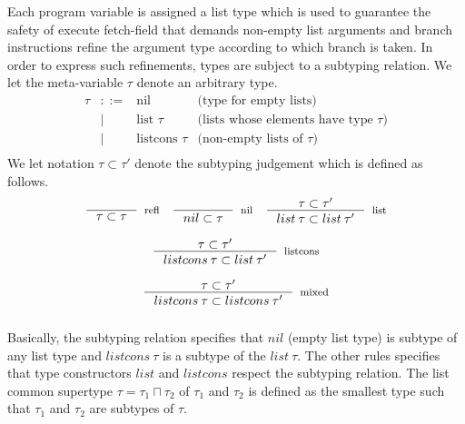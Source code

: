 \documentclass[sigconf]{acmart}
\theoremstyle{definition}
\begin{document}
Each program variable is assigned a list type which is used to guarantee the safety of execute
fetch-field that demands non-empty list arguments and branch instructions refine the argument type
according to which branch is taken. In order to express such refinements, types are subject to a
subtyping relation. We let the meta-variable $\tau$ denote an arbitrary type. 
\[
\begin{array}{rcll}
  \tau & ::=  & \text{nil} & \text{(type for empty lists)}\\
       & \mid & \text{list }\tau & \text{(lists whose elements have type $\tau$)}\\
       & \mid & \text{listcons }\tau & \text{(non-empty lists of $\tau$)}\\
\end{array}
\]
We let notation $\tau \subset \tau'$
denote the subtyping judgement which is defined as follows.
\[
\begin{array}{ccc}
  \inference{}
            {\tau\subset \tau}
            [refl]
  &
  \inference{}
            {nil \subset \tau}
            [nil]
  &
  \inference{\tau \subset \tau'}
            {list\:\tau\subset list\:\tau'}
            [list]\\\\
  \multicolumn{3}{c}{
  \inference{\tau \subset \tau'}
            {listcons\:\tau\subset list\:\tau'}
            [listcons]} \\\\
            \multicolumn{3}{c}{
            \inference{\tau \subset \tau'}
            {listcons\:\tau\subset listcons\:\tau'}
            [mixed]} \\\\
\end{array}
\]
Basically, the subtyping relation specifies that $nil$ (empty list type) is
subtype of any list type and $listcons\:\tau$ is a subtype of the $list\:\tau$.
The other rules specifies that type constructors $list$ and $listcons$ respect
the subtyping relation. The list common supertype $\tau = \tau_1 \sqcap \tau_2$ of
$\tau_1$ and $\tau_2$ is defined as the smallest type such that $\tau_1$ and $\tau_2$
are subtypes of $\tau$.
\end{document}
